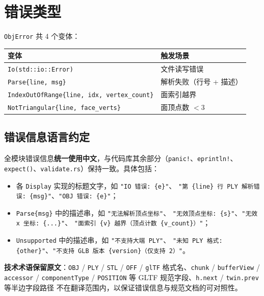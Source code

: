 \documentclass[11pt,a4paper]{article}
\begin{document}
\section{错误类型}

\texttt{ObjError} 共 4 个变体：

\begin{center}
\renewcommand{\arraystretch}{1.18}
\begin{tabular}{@{}ll@{}}
  \toprule
  \textbf{变体} & \textbf{触发场景} \\
  \midrule
  \texttt{Io(std::io::Error)}     & 文件读写错误 \\
  \texttt{Parse\{line, msg\}}     & 解析失败（行号 + 描述） \\
  \texttt{IndexOutOfRange\{line, idx, vertex\_count\}} & 面索引越界 \\
  \texttt{NotTriangular\{line, face\_verts\}} & 面顶点数 $< 3$ \\
  \bottomrule
\end{tabular}
\end{center}

\subsection{错误信息语言约定}

全模块错误信息\textbf{统一使用中文}，与代码库其余部分（\texttt{panic!}、\texttt{eprintln!}、
\texttt{expect()}、\texttt{validate.rs}）保持一致。具体包括：
\begin{itemize}
  \item 各 \texttt{Display} 实现的标题文字，如 \texttt{"IO 错误: \{e\}"}、
        \texttt{"第 \{line\} 行 PLY 解析错误: \{msg\}"}、\texttt{"OBJ 错误: \{e\}"}；
  \item \texttt{Parse\{msg\}} 中的描述串，如 \texttt{"无法解析顶点坐标"}、
        \texttt{"无效顶点坐标: \{s\}"}、\texttt{"无效 x 坐标: \{...\}"}、
        \texttt{"面索引 \{v\} 越界（顶点计数 \{v\_count\}）"}；
  \item \texttt{Unsupported} 中的描述串，如 \texttt{"不支持大端 PLY"}、
        \texttt{"未知 PLY 格式: \{other\}"}、\texttt{"不支持 GLB 版本 \{version\}（仅支持 2）"}。
\end{itemize}
\textbf{技术术语保留原文}：\texttt{OBJ} / \texttt{PLY} / \texttt{STL} / \texttt{OFF} / \texttt{glTF}
格式名、\texttt{chunk} / \texttt{bufferView} / \texttt{accessor} / \texttt{componentType} /
\texttt{POSITION} 等 GLTF 规范字段、\texttt{h.next} / \texttt{twin.prev} 等半边字段路径
不在翻译范围内，以保证错误信息与规范文档的可对照性。
\end{document}
